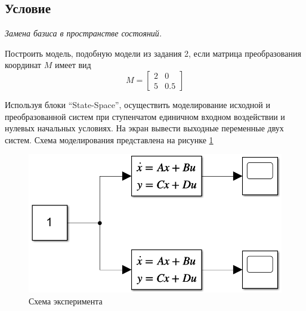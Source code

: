 \documentclass[a4paper, 12pt]{article}
\begin{document}
    \subsection{Условие}
    \textit{Замена базиса в пространстве состояний.}
    \begin{compactitem}
    \item Построить модель, подобную модели из задания 2, если матрица преобразования координат $M$ имеет вид
    $$M=\begin{bmatrix}
        2 & 0\\
        5 & 0.5
    \end{bmatrix}$$
    \item Используя блоки ``State-Space'', осуществить моделирование исходной и
    преобразованной систем при ступенчатом единичном входном воздействии и нулевых
    начальных условиях. На экран вывести выходные переменные двух систем. Схема
    моделирования представлена на рисунке \ref{fig:scheme3}
    \begin{figure}[H]
        \centering
        \includegraphics[scale=0.5]{scheme3.png}
        \captionsetup{skip=0pt}
        \caption{Схема эксперимента}
        \label{fig:scheme3}
    \end{figure}
    \end{compactitem}
\end{document}
